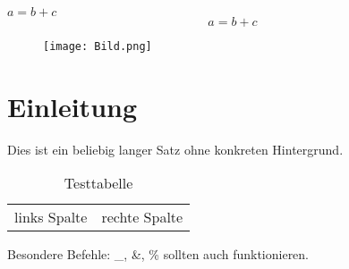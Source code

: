 \documentclass[a4paper, 11pt,german]{scrartcl}
\begin{document}
	$ a = b + c $
	\begin{equation}
		a = b + c
	\end{equation}
	\begin{figure}
		\texttt{[image: Bild.png]}
	\end{figure}
	\section{Einleitung}
	Dies ist ein beliebig langer Satz ohne konkreten Hintergrund.
	\cite[S. 22]{Mustermann}
	\begin{table}[tb]
		\centering
		\begin{tabular}{ll}
			links Spalte & rechte Spalte \\
		\end{tabular}
		\caption[Eine Testtabelle]{Testtabelle}
		\label{tab:test}
	\end{table}
	Besondere Befehle: \_, \&, \% sollten auch funktionieren.
\end{document}
